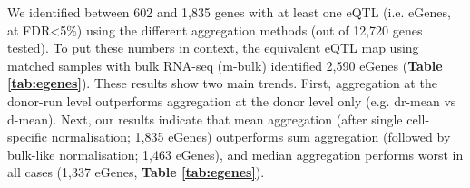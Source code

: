 

We identified between 602 and 1,835 genes with at least one eQTL (i.e. eGenes, at FDR<5\%) using the different aggregation methods (out of 12,720 genes tested). 
To put these numbers in context, the equivalent eQTL map using matched samples with bulk RNA-seq (m-bulk) identified 2,590 eGenes (\textbf{Table \ref{tab:egenes}}). 
These results show two main trends. 
First, aggregation at the donor-run level outperforms aggregation at the donor level only (e.g. dr-mean vs d-mean). 
Next, our results indicate that mean aggregation (after single cell-specific normalisation; 1,835 eGenes) outperforms sum aggregation (followed by bulk-like normalisation; 1,463 eGenes), and median aggregation performs worst in all cases (1,337 eGenes, \textbf{Table \ref{tab:egenes}}). \\

